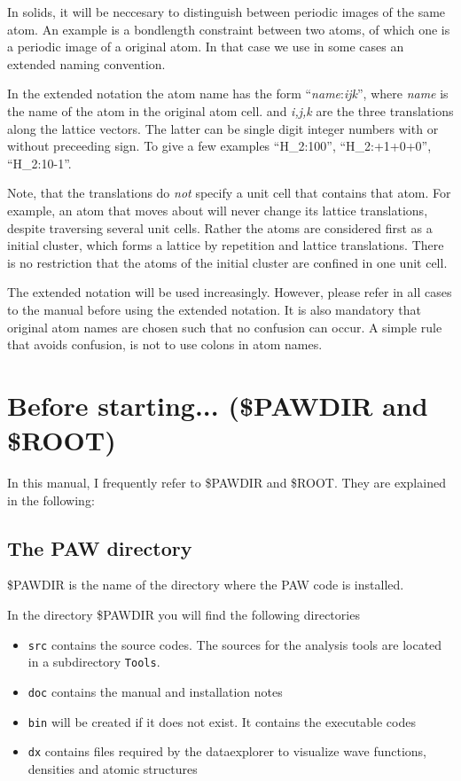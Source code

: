 \documentclass[final,12pt]{article}
\begin{document}
In solids, it will be neccesary to distinguish between periodic images
of the same atom. An example is a bondlength constraint between two
atoms, of which one is a periodic image of a original atom. In that
case we use in some cases an extended naming convention.

In the extended notation the atom name has the form
``\textit{name}:\textit{ijk}'', where {\it name} is the name of the
atom in the original atom cell. and {\it i,j,k} are the three
translations along the lattice vectors. The latter can be single digit
integer numbers with or without preceeding sign. To give a few
examples ``H\_2:100'', ``H\_2:+1+0+0'', ``H\_2:10-1''.

Note, that the translations do {\em not} specify a unit cell that
contains that atom. For example, an atom that moves about will never
change its lattice translations, despite traversing several unit
cells. Rather the atoms are considered first as a initial cluster, which forms
a lattice by repetition and lattice translations. There is no
restriction that the atoms of the initial cluster are confined in one
unit cell.

The extended notation will be used increasingly. However, please refer
in all cases to the manual before using the extended notation. It is
also mandatory that original atom names are chosen such that no
confusion can occur. A simple rule that avoids confusion, is not to
use colons in atom names.

\section{Before starting... (\$PAWDIR and \$ROOT)}
In this manual, I frequently refer to \$PAWDIR and \$ROOT. They are explained in the following:

\subsection{The PAW directory}
\$PAWDIR is the name of the directory where the PAW code is
installed. 

In the directory \$PAWDIR you will find the following directories 
\begin{itemize}
\item \verb|src| contains the source codes. The sources for the
analysis tools are located in a subdirectory \verb|Tools|.
\item \verb|doc| contains the manual and installation notes
\item \verb|bin| will be created if it does not exist. It contains the
executable codes
\item \verb|dx| contains files required by the dataexplorer to
visualize wave functions, densities and atomic structures
\end{itemize}
\end{document}

